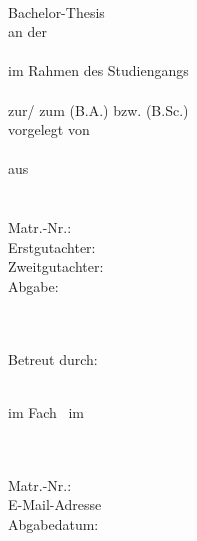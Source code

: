 \documentclass[a4paper, 11pt, german]{article}
\def\True{1}
\begin{document}


\if\parenthesisCite\True
	\let\cite\parencite
\fi

\begin{titlepage}
	\if\BachlorThesis\True
		\begin{center}

			\textbf{\thetitle}\\
			\vspace{2cm}
			Bachelor-Thesis\\
			an der \\
			\Hochschulname\\
			im Rahmen des Studiengangs \\
			\Studiengang \\
			zur/ zum \Abschlussbezeinung (B.A.) bzw. (B.Sc.) \\

			\vspace{0.5cm}
			vorgelegt von \\
			\theauthor \\
			aus\\
			\Addresse\\
			\Email\\

			\vspace{0.5cm}
			Matr.-Nr.: \MatrNummer\\

			\vfill
			Erstgutachter: \Pruefer \\
			Zweitgutachter: \ZweitGutachter \\
			\vspace{0.5cm}
			Abgabe: \thedate
		\end{center}

	\else

		\raggedright
		\Hochschulname \\
		\Studiengang\\
		Betreut durch: \Pruefer

		\vfill
		\begin{center}
			\ArtArbeit\\
			\vspace{1ex}
			im Fach \Modul~im \Semester\\

			\vspace{3.5cm}
			\textbf{\thetitle}

		\end{center}

		\vfill
		\theauthor\\
		\Addresse\\
		Matr.-Nr.: \MatrNummer\\
		\vspace{1ex}
		E-Mail-Adresse \Email\\
		\vspace{3ex}
		Abgabedatum: \thedate

	\fi
\end{titlepage}
\restoregeometry
\end{document}
